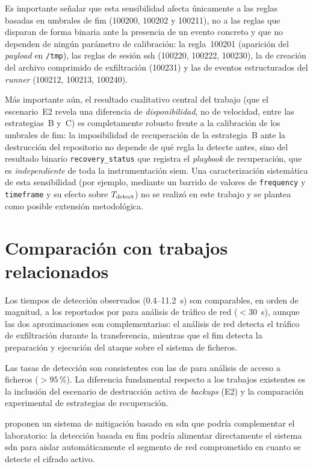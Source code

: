 \documentclass[../main.tex]{subfiles}
\begin{document}
Es importante señalar que esta sensibilidad afecta únicamente a las reglas basadas
en umbrales de \gls{fim} (100200, 100202 y 100211), no a las reglas que disparan de
forma binaria ante la presencia de un evento concreto y que no dependen de ningún
parámetro de calibración: la regla~100201 (aparición del \emph{payload} en
\texttt{/tmp}), las reglas de sesión \gls{ssh} (100220, 100222, 100230), la de
creación del archivo comprimido de exfiltración (100231) y las de eventos
estructurados del \emph{runner} (100212, 100213, 100240).

Más importante aún, el resultado cualitativo central del trabajo (que el
escenario~E2 revela una diferencia de \emph{disponibilidad}, no de velocidad, entre
las estrategias~B y~C) es completamente robusto frente a la calibración de los
umbrales de \gls{fim}: la imposibilidad de recuperación de la estrategia~B ante la
destrucción del repositorio no depende de qué regla la detecte antes, sino del
resultado binario \texttt{recovery\_status} que registra el \emph{playbook} de
recuperación, que es \emph{independiente} de toda la instrumentación \gls{siem}. Una
caracterización sistemática de esta sensibilidad (por ejemplo, mediante un
barrido de valores de \texttt{frequency} y \texttt{timeframe} y su efecto sobre
$T_{\text{detect}}$) no se realizó en este trabajo y se plantea como posible extensión
metodológica.

\section{Comparación con trabajos relacionados}

Los tiempos de detección observados (0.4--11.2~s) son comparables, en orden de
magnitud, a los reportados por \textcite{almashhadani2019} para análisis de tráfico
de red ($< 30$~s), aunque las dos aproximaciones son complementarias: el análisis
de red detecta el tráfico de exfiltración durante la transferencia, mientras que el
\gls{fim} detecta la preparación y ejecución del ataque sobre el sistema de
ficheros.

Las tasas de detección son consistentes con las de \textcite{moussaileb2021} para
análisis de acceso a ficheros ($> 95\,\%$). La diferencia fundamental respecto a
los trabajos existentes es la inclusión del escenario de destrucción activa de
\emph{backups} (E2) y la comparación experimental de estrategias de recuperación.

\textcite{cabaj2016} proponen un sistema de mitigación basado en \gls{sdn} que
podría complementar el laboratorio: la detección basada en \gls{fim} podría
alimentar directamente el sistema \gls{sdn} para aislar automáticamente el
segmento de red comprometido en cuanto se detecte el cifrado activo.
\end{document}

